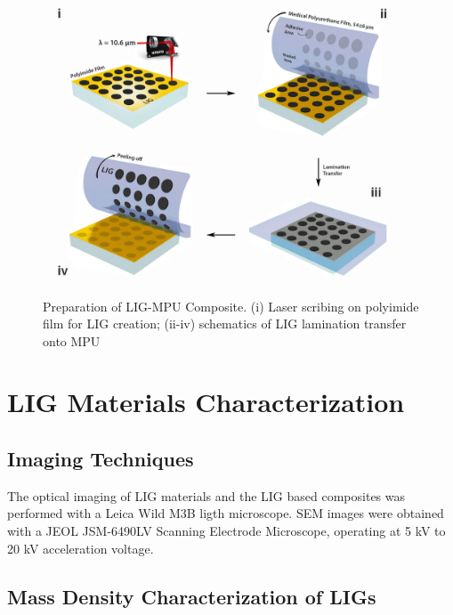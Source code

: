 \begin{figure}[H]
\centering
\includegraphics[width=1\textwidth]{Figures/ExperimentalSetup/LIG_Fixomull_Production.jpg}
\medskip
\caption{Preparation of LIG-MPU Composite. (i) Laser scribing on polyimide film for LIG creation; (ii-iv) schematics of LIG lamination transfer onto MPU
}
\label{fig:MPU_LIG_production}
\end{figure}


\section{LIG Materials Characterization}


\subsection{Imaging Techniques}

The optical imaging of LIG materials and the LIG based composites was performed with a Leica Wild M3B ligth microscope. SEM images were obtained with a JEOL JSM-6490LV Scanning Electrode Microscope, operating at 5 kV to 20 kV acceleration voltage.

\subsection{Mass Density Characterization of LIGs}

